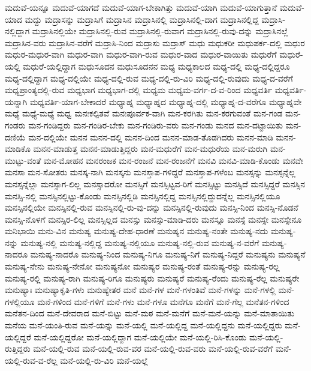 {ಮದುವೆ-ಯನ್ನೂ
ಮದುವೆ-ಯಾಗದೆ
ಮದುವೆ-ಯಾಗ-ಬೇಕಾಗಿತ್ತು
ಮದುವೆ-ಯಾಗಿ
ಮದುವೆ-ಯಾಗುತ್ತಾನೆ
ಮದುವೆ-ಯಾದ
ಮದ್ದು
ಮದ್ರಾಸನ್ನು
ಮದ್ರಾಸಿಗೆ
ಮದ್ರಾಸಿನ
ಮದ್ರಾಸಿನಲ್ಲಿ
ಮದ್ರಾಸಿನಲ್ಲಿ-ದಾಗ
ಮದ್ರಾಸಿನಲ್ಲಿದ್ದ
ಮದ್ರಾಸಿ-ನಲ್ಲಿದ್ದಾಗ
ಮದ್ರಾಸಿನಲ್ಲಿಯೇ
ಮದ್ರಾಸಿನಲ್ಲಿ-ರುವ
ಮದ್ರಾಸಿನಲ್ಲಿ-ರುವಾಗ
ಮದ್ರಾಸಿನಲ್ಲಿ-ರುವು-ದನ್ನು
ಮದ್ರಾಸಿನಲ್ಲೆ
ಮದ್ರಾಸಿನ-ವರು
ಮದ್ರಾಸಿನ-ವರೆಗೆ
ಮದ್ರಾಸಿ-ನಿಂದ
ಮದ್ರಾಸು
ಮದ್ರಾಸ್
ಮಧು
ಮಧುಕರೀ
ಮಧುಪರ್ಕ-ದಲ್ಲಿ
ಮಧುರ
ಮಧುರ-ಮಧುರ-ವಾಗಿ
ಮಧುರ-ವಾಗಿ
ಮಧುರ-ವಾಗಿ-ರುವ
ಮಧುರ-ವಾದ
ಮಧುರ-ವಾಯಿತು
ಮಧುರೆಗೆ
ಮಧುರೆ-ಯಲ್ಲಿ
ಮಧುರೆ-ಯಲ್ಲಿದ್ದಾಗ
ಮಧುಸೂದನ
ಮಧುಸೂದನನ
ಮಧ್ಯ
ಮಧ್ಯಕಾಲದ
ಮಧ್ಯ-ದಲ್ಲಿ
ಮಧ್ಯ-ದಲ್ಲಿದ್ದರೂ
ಮಧ್ಯ-ದಲ್ಲಿದ್ದಾಗ
ಮಧ್ಯ-ದಲ್ಲಿಯೇ
ಮಧ್ಯ-ದಲ್ಲಿ-ರುವ
ಮಧ್ಯ-ದಲ್ಲಿ-ರು-ವಿರಿ
ಮಧ್ಯ-ದಲ್ಲಿ-ರುವುದು
ಮಧ್ಯ-ದ-ವರೆಗೆ
ಮಧ್ಯಪ್ರಾಂತ್ಯದಲ್ಲಿ-ರುವ
ಮಧ್ಯಭಾಗ
ಮಧ್ಯಭಾಗ-ದಲ್ಲಿ
ಮಧ್ಯಮ
ಮಧ್ಯಮ-ವರ್ಗ-ದ-ವ-ರಿಂದ
ಮಧ್ಯವರ್ತಿ
ಮಧ್ಯವರ್ತಿ-ಯನ್ನಾಗಿ
ಮಧ್ಯವರ್ತಿ-ಯಾಗ-ಬೇಕಾದರೆ
ಮಧ್ಯಾಹ್ನ
ಮಧ್ಯಾಹ್ನದ
ಮಧ್ಯಾಹ್ನ-ದಲ್ಲಿ
ಮಧ್ಯಾಹ್ನ-ದ-ವರೆಗೂ
ಮಧ್ಯಾಹ್ನವೇ
ಮಧ್ಯೆ
ಮಧ್ಯೆ-ಮಧ್ಯೆ
ಮಧ್ವ
ಮನಃಕಲ್ಪಿತವೆ
ಮನಃಪೂರ್ವಕ-ವಾಗಿ
ಮನ-ಕರಗಿತು
ಮನ-ಕರಗುವಂತೆ
ಮನ-ಗಂಡ
ಮನ-ಗಂಡರು
ಮನ-ಗಂಡಿದ್ದರು
ಮನ-ಗಂಡಿರ-ಬೇಕು
ಮನ-ಗಂಡಿರು-ವರು
ಮನ-ಗಂಡು
ಮನದ
ಮನ-ದಟ್ಟಾಯಿತು
ಮನ-ದಣಿಯೆ
ಮನ-ದಲ್ಲಿಯೇ
ಮನನ
ಮನನ-ದಲ್ಲಿ
ಮನನ-ದಿಂದ
ಮನನ-ಮಾಡ-ತೊಡಗಿದರು
ಮನನ-ಮಾಡಿ
ಮನನ-ಮಾಡಿಕೊ
ಮನನ-ಮಾಡುತ್ತ
ಮನನ-ಮಾಡುತ್ತಿದ್ದರು
ಮನ-ಮಧುರೆಗೆ
ಮನ-ಮಧುರೆಯ
ಮನ-ಮರುಗಿ
ಮನ-ಮುಟ್ಟು-ವಂತೆ
ಮನ-ಮೋಹನ
ಮನರಂಜಕ
ಮನ-ರಂಜನೆ
ಮನ-ರಂಜನೆಗೆ
ಮನವಿ
ಮನವಿ-ಮಾಡಿ-ಕೊಂಡು
ಮನವೇ
ಮನಸಾ
ಮನ-ಸೋತರು
ಮನಸ್ಕ-ನಾಗಿ
ಮನಸ್ಕನು
ಮನಸ್ತಾಪ-ಗಳಿದ್ದರೆ
ಮನಸ್ತಾಪ-ಗಳೆಂಬ
ಮನಸ್ಸನ್ನು
ಮನಸ್ಸನ್ನೆಲ್ಲ
ಮನಸ್ಸನ್ನೆಲ್ಲಾ
ಮನಸ್ಸಾಗ-ಲಿಲ್ಲ
ಮನಸ್ಸಾದರೋ
ಮನಸ್ಸಿಗೆ
ಮನಸ್ಸಿಟ್ಟವ-ರಿಗೆ
ಮನಸ್ಸಿಟ್ಟು
ಮನಸ್ಸಿದೆ
ಮನಸ್ಸಿದ್ದರೆ
ಮನಸ್ಸಿನ
ಮನಸ್ಸಿ-ನಲ್ಲಿ
ಮನಸ್ಸಿನಲ್ಲಿಟ್ಟು-ಕೊಂಡು
ಮನಸ್ಸಿನಲ್ಲಿಡಿ
ಮನಸ್ಸಿನಲ್ಲಿದ್ದ
ಮನಸ್ಸಿನಲ್ಲಿದ್ದುದನ್ನೆಲ್ಲ
ಮನಸ್ಸಿನಲ್ಲಿಯೂ
ಮನಸ್ಸಿನಲ್ಲಿಯೇ
ಮನಸ್ಸಿನಲ್ಲಿ-ರುವ
ಮನಸ್ಸಿನಲ್ಲಿ-ರು-ವು-ದನ್ನು
ಮನಸ್ಸಿನಲ್ಲಿ-ರುವುದು
ಮನಸ್ಸಿ-ನಿಂದ
ಮನಸ್ಸಿ-ನೊಡನೆ
ಮನಸ್ಸಿ-ನೊಳಗೆ
ಮನಸ್ಸಿರ-ಲಿಲ್ಲ
ಮನಸ್ಸಿಲ್ಲದ
ಮನಸ್ಸು
ಮನಸ್ಸು-ಮಾಡಿ-ದರು
ಮನಸ್ಸೂ
ಮನಸ್ಸೆ
ಮನಸ್ಸೇ
ಮನಸ್ಸೇನೂ
ಮನಿಭಾಯಿ
ಮನು-ವಿನ
ಮನುಷ್ಯ
ಮನುಷ್ಯ-ದೇಹ-ಧಾರಣೆ
ಮನುಷ್ಯನ
ಮನುಷ್ಯ-ನಂತೇ
ಮನುಷ್ಯ-ನದು
ಮನುಷ್ಯ-ನನ್ನು
ಮನುಷ್ಯ-ನಲ್ಲಿ
ಮನುಷ್ಯ-ನಲ್ಲಿದ್ದ
ಮನುಷ್ಯ-ನಲ್ಲಿಯೂ
ಮನುಷ್ಯ-ನಲ್ಲಿ-ರುವ
ಮನುಷ್ಯ-ನ-ವರೆಗೆ
ಮನುಷ್ಯ-ನಾದರೂ
ಮನುಷ್ಯ-ನಾದರೊ
ಮನುಷ್ಯ-ನಿಂದ
ಮನುಷ್ಯ-ನಿಗೂ
ಮನುಷ್ಯ-ನಿಗೆ
ಮನುಷ್ಯ-ನಿದ್ದರೆ
ಮನುಷ್ಯನು
ಮನುಷ್ಯನೆ
ಮನುಷ್ಯ-ನೇನು
ಮನುಷ್ಯ-ನೇನೋ
ಮನುಷ್ಯನೋ
ಮನುಷ್ಯರ
ಮನುಷ್ಯ-ರಂತೆ
ಮನುಷ್ಯ-ರನ್ನು
ಮನುಷ್ಯ-ರಲ್ಲ
ಮನುಷ್ಯ-ರಲ್ಲಿ
ಮನುಷ್ಯ-ರಾಗಿ
ಮನುಷ್ಯ-ರಿಗೂ
ಮನುಷ್ಯರು
ಮನುಷ್ಯರೆ
ಮನುಷ್ಯ-ರೆಂದು
ಮನುಷ್ಯ-ರೆಲ್ಲ
ಮನುಷ್ಯರೇ
ಮನುಷ್ಯಾಃ
ಮನುಷ್ಯಾಕೃತಿ-ಗಳು
ಮನುಷ್ಯೇತರ
ಮನೆ
ಮನೆ-ಗಳ
ಮನೆ-ಗಳಂತಿವೆ
ಮನೆ-ಗಳನ್ನು
ಮನೆ-ಗಳಲ್ಲಿ
ಮನೆ-ಗಳಲ್ಲಿಯೂ
ಮನೆ-ಗಳಿಂದ
ಮನೆ-ಗಳಿಗೆ
ಮನೆ-ಗಳು
ಮನೆ-ಗಳೂ
ಮನೆಗೂ
ಮನೆಗೆ
ಮನೆ-ಗೆಲ್ಲ
ಮನೆತನ-ಗಳಿಂದ
ಮನೆತನ-ದಿಂದ
ಮನೆ-ದೇವರಾದ
ಮನೆ-ಬಿಟ್ಟು
ಮನೆ-ಮಠ
ಮನೆ-ಮನೆಗೆ
ಮನೆ-ಮನೆ-ಯನ್ನು
ಮನೆ-ಮಾತಾಯಿತು
ಮನೆಯ
ಮನೆ-ಯಂತಿ-ರುವ
ಮನೆ-ಯನ್ನು
ಮನೆ-ಯಲ್ಲಿ
ಮನೆ-ಯಲ್ಲಿದ್ದ
ಮನೆ-ಯಲ್ಲಿದ್ದನು
ಮನೆ-ಯಲ್ಲಿದ್ದರು
ಮನೆ-ಯಲ್ಲಿದ್ದರೆ
ಮನೆ-ಯಲ್ಲಿದ್ದರೋ
ಮನೆ-ಯಲ್ಲಿದ್ದಾಗ
ಮನೆ-ಯಲ್ಲಿಯೇ
ಮನೆ-ಯಲ್ಲಿ-ರಿಸಿ-ಕೊಂಡು
ಮನೆ-ಯಲ್ಲಿ-ರುತ್ತಿದ್ದರು
ಮನೆ-ಯಲ್ಲಿ-ರುವ
ಮನೆ-ಯಲ್ಲಿ-ರುವ-ವರ
ಮನೆ-ಯಲ್ಲಿ-ರುವ-ವರು
ಮನೆ-ಯಲ್ಲಿ-ರುವ-ವರೆಗೆ
ಮನೆ-ಯಲ್ಲಿ-ರುವ-ವ-ರೆಲ್ಲ
ಮನೆ-ಯಲ್ಲಿ-ರು-ವಿರಿ
ಮನೆ-ಯಲ್ಲೆ
}
